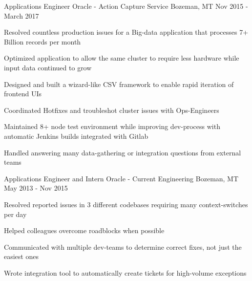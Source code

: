 \begin{cventries}
  \cventry
    {Applications Engineer} %
    {Oracle - Action Capture Service} %
    {Bozeman, MT} %
    {Nov 2015 - March 2017} %
    {
      \begin{cvitems} %
        \item {Resolved countless production issues for a Big-data application that processes 7+ Billion records per month}
        \item {Optimized application to allow the same cluster to require less hardware while input data continued to grow}
        \item {Designed and built a wizard-like CSV framework to enable rapid iteration of frontend UIs}
        \item {Coordinated Hotfixes and troubleshot cluster issues with Ops-Engineers}
        \item {Maintained 8+ node test environment while improving dev-process with automatic Jenkins builds integrated with Gitlab}
        \item {Handled answering many data-gathering or integration questions from external teams}
      \end{cvitems}
    }

  \cventry
    {Applications Engineer and Intern} %
    {Oracle - Current Engineering} %
    {Bozeman, MT} %
    {May 2013 - Nov 2015} %
    {
      \begin{cvitems} %
        \item {Resolved reported issues in 3 different codebases requiring many context-switches per day}
        \item {Helped colleagues overcome roadblocks when possible}
        \item {Communicated with multiple dev-teams to determine correct fixes, not just the easiest ones}
        \item {Wrote integration tool to automatically create tickets for high-volume exceptions}
      \end{cvitems}
    }

\end{cventries}
